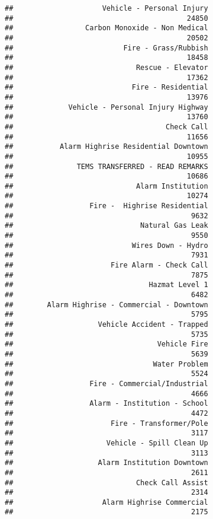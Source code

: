 \documentclass[]{article}
\begin{document}
\begin{verbatim}
##                     Vehicle - Personal Injury 
##                                         24850 
##                 Carbon Monoxide - Non Medical 
##                                         20502 
##                          Fire - Grass/Rubbish 
##                                         18458 
##                             Rescue - Elevator 
##                                         17362 
##                            Fire - Residential 
##                                         13976 
##             Vehicle - Personal Injury Highway 
##                                         13760 
##                                    Check Call 
##                                         11656 
##           Alarm Highrise Residential Downtown 
##                                         10955 
##               TEMS TRANSFERRED - READ REMARKS 
##                                         10686 
##                             Alarm Institution 
##                                         10274 
##                  Fire -  Highrise Residential 
##                                          9632 
##                              Natural Gas Leak 
##                                          9550 
##                            Wires Down - Hydro 
##                                          7931 
##                       Fire Alarm - Check Call 
##                                          7875 
##                                Hazmat Level 1 
##                                          6482 
##        Alarm Highrise - Commercial - Downtown 
##                                          5795 
##                    Vehicle Accident - Trapped 
##                                          5735 
##                                  Vehicle Fire 
##                                          5639 
##                                 Water Problem 
##                                          5524 
##                  Fire - Commercial/Industrial 
##                                          4666 
##                  Alarm - Institution - School 
##                                          4472 
##                       Fire - Transformer/Pole 
##                                          3117 
##                      Vehicle - Spill Clean Up 
##                                          3113 
##                    Alarm Institution Downtown 
##                                          2611 
##                             Check Call Assist 
##                                          2314 
##                     Alarm Highrise Commercial 
##                                          2175 

\end{verbatim}
\end{document}
